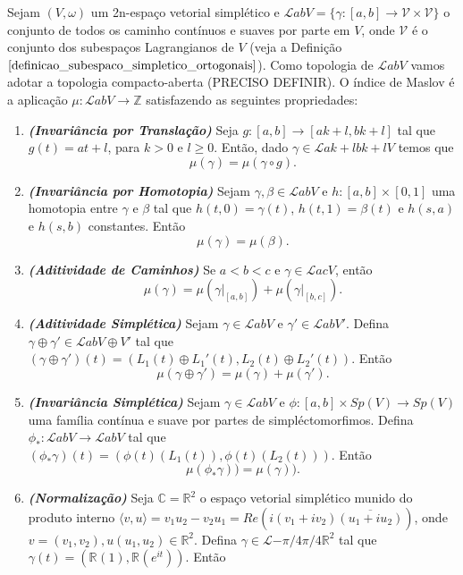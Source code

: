 \documentclass[12pt]{book}
\newcommand{\caminhos}{\mathcal{L}}
\newcommand{\gruposimpletico}[1]{Sp(#1)}
\newcommand{\inteiros}{\mathbb{Z}}
\newcommand{\iprod}[2]{\langle #1, #2 \rangle}
\newcommand{\real}[1]{\mathbb{R}^{#1}}
\newcommand{\reta}{\real{}}
\newcommand{\vermelho}[1]{{\color{red}#1}}
\begin{document}
	Sejam $(V, \omega)$ um 2n-espaço vetorial simplético e $\caminhos{a}{b}{V}= \{\gamma:[a,b]\to \mathcal{V} \times \mathcal{V} \}$ o conjunto de todos os caminho contínuos e suaves por parte em $V$, onde $\mathcal{V}$ é o conjunto dos subespaços Lagrangianos de $V$ (veja a Definição $\ref{definicao_subespaco_simpletico_ortogonais}$). Como topologia de $\caminhos{a}{b}{V}$ vamos \vermelho{adotar a topologia compacto-aberta (PRECISO DEFINIR).} O índice de Maslov é a aplicação $\mu:\caminhos{a}{b}{V}\to \inteiros$ satisfazendo as seguintes propriedades:
	\begin{enumerate}
		\item \textbf{\textit{(Invariância por Translação)}} Seja $g: [a,b] \to [ak+l, bk+l]$ tal que $g(t)=at+l$, para $k>0$ e $l\geq 0$. Então, dado $\gamma\in \caminhos{ak+l}{bk+l}{V}$ temos que 
		$$
		\mu(\gamma) = \mu(\gamma\circ g).
		$$
		\item \textbf{\textit{(Invariância por Homotopia)}} Sejam $\gamma, \beta \in \caminhos{a}{b}{V}$ e $h:[a,b] \times [0,1]$ uma homotopia entre $\gamma$ e $\beta$ tal que $h(t,0)= \gamma(t)$, $h(t,1) = \beta(t)$ e $h(s, a)$ e $h(s, b)$ constantes. Então
		$$
		\mu(\gamma) = \mu(\beta).
		$$
		\item \textbf{\textit{(Aditividade de Caminhos)}} Se $a<b<c$ e $\gamma \in \caminhos{a}{c}{V}$, então $$
		\mu(\gamma)=\mu(\gamma|_{[a,b]})+\mu(\gamma|_{[b,c]}).
		$$
		\item \textbf{\textit{(Aditividade Simplética)}} Sejam $\gamma \in \caminhos{a}{b}{V}$ e $\gamma' \in \caminhos{a}{b}{V'}$. Defina $\gamma\oplus\gamma' \in \caminhos{a}{b}{V\oplus V'}$ tal que $(\gamma\oplus\gamma' )(t) = (L_{1}(t)\oplus L_{1}'(t), L_{2}(t)\oplus L_{2}'(t))$. Então 
		$$
		\mu(\gamma\oplus\gamma' )= \mu(\gamma)+\mu(\gamma' ).
		$$
		\item \textbf{\textit{(Invariância Simplética)}} Sejam $\gamma \in \caminhos{a}{b}{V}$ e $\phi:[a,b]\times \gruposimpletico{V} \to \gruposimpletico{V}$ uma família contínua e suave por partes de simpléctomorfimos. Defina $\phi_{*}:\caminhos{a}{b}{V}\to \caminhos{a}{b}{V}$ tal que $ (\phi_{*}\gamma)(t) = (\phi(t)(L_{1}(t)), \phi(t)(L_{2}(t)))$. Então 
		$$
		\mu(\phi_{*}\gamma)) = \mu(\gamma)).
		$$
		\item \textbf{\textit{(Normalização)}} Seja $\mathbb{C} = \real{2}$ o espaço vetorial simplético munido do produto interno $\iprod{v}{u} = v_{1}u_{2}- v_{2}u_{1} = Re(i(v_{1}+iv_{2})\overline{(u_{1}+iu_{2})})$, onde $v=(v_{1},v_{2}),u (u_{1},u_{2})\in \real{2}$. Defina $\gamma \in \caminhos{-\pi/4}{\pi/4}{\real{2}}$ tal que $\gamma(t) = (\reta(1), \reta(e^{it}))$. Então

\end{enumerate}
\end{document}
